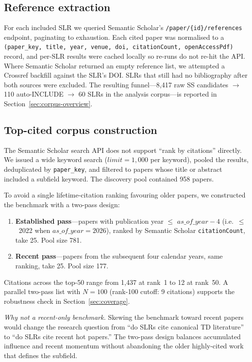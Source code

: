 \documentclass[conference]{IEEEtran}
\begin{document}
\subsection{Reference extraction}
For each included SLR we queried Semantic Scholar's
\texttt{/paper/\{id\}/references} endpoint, paginating to exhaustion. Each
cited paper was normalised to a \texttt{(paper\_key, title, year, venue,
doi, citationCount, openAccessPdf)} record, and per-SLR results were cached
locally so re-runs do not re-hit the API. Where Semantic Scholar returned
an empty reference list, we attempted a Crossref backfill against the SLR's
DOI. SLRs that still had no bibliography after both sources were excluded.
The resulting funnel---8{,}417 raw SS candidates $\to$ 110 auto-INCLUDE $\to$
60 SLRs in the analysis corpus---is reported in
Section~\ref{sec:corpus-overview}.

\subsection{Top-cited corpus construction}
The Semantic Scholar search API does not support ``rank by citations''
directly. We issued a wide keyword search ($\textit{limit}=1{,}000$ per
keyword), pooled the results, deduplicated by \texttt{paper\_key}, and
filtered to papers whose title or abstract included a subfield keyword. The
discovery pool contained 958 papers.

To avoid a single lifetime-citation ranking favouring older papers, we
constructed the benchmark with a two-pass design:

\begin{enumerate}
  \item \textbf{Established pass}---papers with publication year $\leq$
        $\textit{as\_of\_year}-4$ (i.e.~$\leq$~2022 when $\textit{as\_of\_year}=2026$),
        ranked by Semantic Scholar \texttt{citationCount}, take 25. Pool
        size 781.
  \item \textbf{Recent pass}---papers from the subsequent four calendar
        years, same ranking, take 25. Pool size 177.
\end{enumerate}

Citations across the top-50 range from 1{,}437 at rank~1 to 12 at rank~50. A
parallel two-pass list with $N=100$ (rank-100 cutoff: 9 citations) supports
the robustness check in Section~\ref{sec:coverage}.

\emph{Why not a recent-only benchmark.} Skewing the benchmark toward recent
papers would change the research question from ``do SLRs cite canonical TD
literature'' to ``do SLRs cite recent hot papers.'' The two-pass design
balances accumulated influence and recent momentum without abandoning the
older highly-cited work that defines the subfield.
\end{document}
